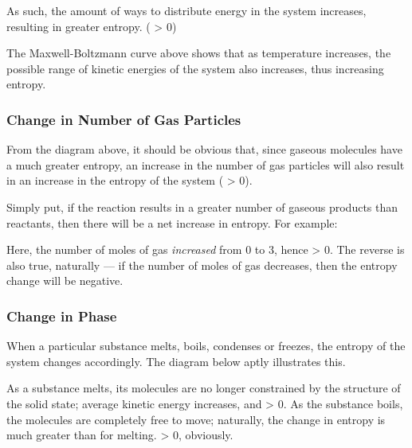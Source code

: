 			As such, the amount of ways to distribute energy in the system increases, resulting in greater entropy. (\entr{} > 0)


			The Maxwell-Boltzmann curve above shows that as temperature increases, the possible range of kinetic energies of the system
			also increases, thus increasing entropy.


		\subsubsection{Change in Number of Gas Particles}

			From the diagram above, it should be obvious that, since gaseous molecules have a much greater entropy, an increase in the number
			of gas particles will also result in an increase in the entropy of the system (\entr{} > 0).

			Simply put, if the reaction results in a greater number of gaseous products than reactants, then there will be a net
			increase in entropy. For example:


			Here, the number of moles of gas \emph{increased} from 0 to 3, hence \entr{} > 0. The reverse is also true, naturally –– if the
			number of moles of gas decreases, then the entropy change will be negative.


		\subsubsection{Change in Phase}

			When a particular substance melts, boils, condenses or freezes, the entropy of the system changes accordingly.
			The diagram below aptly illustrates this.


			As a substance melts, its molecules are no longer constrained by the structure of the solid state; average kinetic energy increases,
			and \entr{} > 0. As the substance boils, the molecules are completely free to move; naturally, the change in entropy is much greater
			than for melting. \entr{} > 0, obviously.


